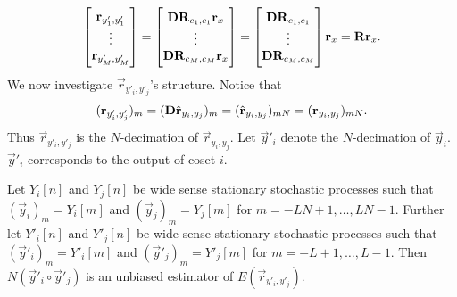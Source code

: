 \documentclass[a4paper, openany, oneside]{memoir}
\begin{document}
\begin{align*}
    \begin{bmatrix}
        \boldsymbol{\mathbf{r}}_{y'_1,y'_1} \\
        \vdots \\
        \boldsymbol{\mathbf{r}}_{y'_M,y'_M}
    \end{bmatrix}
    = \begin{bmatrix}
        \boldsymbol{\mathbf{D}}\boldsymbol{\mathbf{R}}_{c_1,c_1} \boldsymbol{\mathbf{r}}_x \\
        \vdots \\
        \boldsymbol{\mathbf{D}}\boldsymbol{\mathbf{R}}_{c_M,c_M} \boldsymbol{\mathbf{r}}_x
    \end{bmatrix}
    = \begin{bmatrix}
        \boldsymbol{\mathbf{D}}\boldsymbol{\mathbf{R}}_{c_1,c_1}\\
        \vdots \\
        \boldsymbol{\mathbf{D}}\boldsymbol{\mathbf{R}}_{c_M,c_M}
    \end{bmatrix} \boldsymbol{\mathbf{r}}_x
    = \boldsymbol{\mathbf{R}} \boldsymbol{\mathbf{r}}_x.
\end{align*}
We now investigate $\vec{r}_{y'_i,y'_j}$'s structure. Notice that
\begin{align*}
    (\boldsymbol{\mathbf{r}}_{y'_i,y'_j})_m = (\boldsymbol{\mathbf{D}} \hat{\boldsymbol{\mathbf{r}}}_{y_i,y_j})_{m} = (\hat{\boldsymbol{\mathbf{r}}}_{y_i,y_j})_{mN} = (\boldsymbol{\mathbf{r}}_{y_i,y_j})_{mN}.
\end{align*}
Thus $\vec{r}_{y'_i,y'_j}$ is the $N$-decimation of $\vec{r}_{y_i,y_j}$. Let $\vec{y}'_i$ denote the $N$-decimation of $\vec{y}_i$. $\vec{y}'_i$ corresponds to the output of coset $i$.

\begin{blockTheorem} \label{th:deci-corr}
    Let $Y_i[n]$ and $Y_j[n]$ be wide sense stationary stochastic processes such that $(\vec{y}_i)_m = Y_i[m]$ and $(\vec{y}_j)_m = Y_j[m]$ for $m=-LN+1,\ldots,LN-1$. Further let $Y'_i[n]$ and $Y'_j[n]$ be wide sense stationary stochastic processes such that $(\vec{y}'_i)_m = Y'_i[m]$ and $(\vec{y}'_j)_m = Y'_j[m]$ for $m=-L+1,\ldots,L-1$. Then $N(\vec{y}'_i \circ \vec{y}'_j)$ is an unbiased estimator of $E(\vec{r}_{y'_i,y'_j})$.
\end{blockTheorem}
\end{document}
